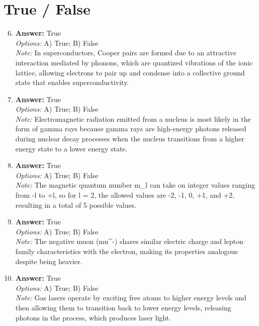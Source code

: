\documentclass[12pt]{article}
\begin{document}
\section*{True / False}
\begin{enumerate}[label=\arabic*.]
\setcounter{enumi}{5}
\item \textbf{Answer:} True
\\ \textit{Options:} A) True; B) False
\\ \textit{Note:} In superconductors, Cooper pairs are formed due to an attractive interaction mediated by phonons, which are quantized vibrations of the ionic lattice, allowing electrons to pair up and condense into a collective ground state that enables superconductivity.
\item \textbf{Answer:} True
\\ \textit{Options:} A) True; B) False
\\ \textit{Note:} Electromagnetic radiation emitted from a nucleus is most likely in the form of gamma rays because gamma rays are high-energy photons released during nuclear decay processes when the nucleus transitions from a higher energy state to a lower energy state.
\item \textbf{Answer:} True
\\ \textit{Options:} A) True; B) False
\\ \textit{Note:} The magnetic quantum number m\_l can take on integer values ranging from -l to +l, so for l = 2, the allowed values are -2, -1, 0, +1, and +2, resulting in a total of 5 possible values.
\item \textbf{Answer:} True
\\ \textit{Options:} A) True; B) False
\\ \textit{Note:} The negative muon (mu^-) shares similar electric charge and lepton family characteristics with the electron, making its properties analogous despite being heavier.
\item \textbf{Answer:} True
\\ \textit{Options:} A) True; B) False
\\ \textit{Note:} Gas lasers operate by exciting free atoms to higher energy levels and then allowing them to transition back to lower energy levels, releasing photons in the process, which produces laser light.
\end{enumerate}
\end{document}
